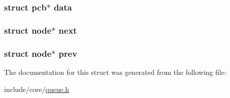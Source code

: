 \subsubsection[{\texorpdfstring{data}{data}}]{\setlength{\rightskip}{0pt plus 5cm}struct {\bf pcb}$\ast$ data}\hypertarget{structnode_a56d819e9a82bb2b5f48ba96fdfe01ca4}{}\label{structnode_a56d819e9a82bb2b5f48ba96fdfe01ca4}
\subsubsection[{\texorpdfstring{next}{next}}]{\setlength{\rightskip}{0pt plus 5cm}struct {\bf node}$\ast$ next}\hypertarget{structnode_a0dc1b6470487aa86d9936e3cab8b95be}{}\label{structnode_a0dc1b6470487aa86d9936e3cab8b95be}
\subsubsection[{\texorpdfstring{prev}{prev}}]{\setlength{\rightskip}{0pt plus 5cm}struct {\bf node}$\ast$ prev}\hypertarget{structnode_a530843171ca1a6e033bac999737cb184}{}\label{structnode_a530843171ca1a6e033bac999737cb184}


The documentation for this struct was generated from the following file\+:\begin{DoxyCompactItemize}
\item 
include/core/\hyperlink{queue_8h}{queue.\+h}\end{DoxyCompactItemize}
